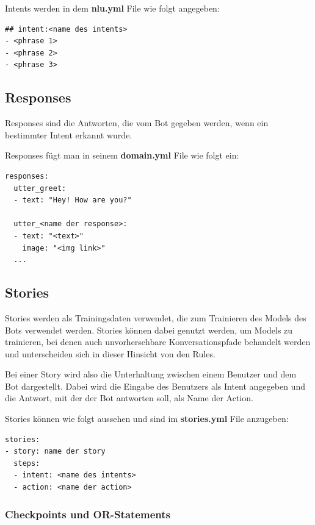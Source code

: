 Intents werden in dem \textbf{nlu.yml} File wie folgt angegeben:

\begin{lstlisting}[label={lst: Intent Example}]
## intent:<name des intents>
- <phrase 1>
- <phrase 2>
- <phrase 3>
\end{lstlisting}

\subsection{Responses}

Responses sind die Antworten, die vom Bot gegeben werden, wenn ein bestimmter Intent erkannt wurde.\cite{responses}

Responses fügt man in seinem \textbf{domain.yml} File wie folgt ein:

\begin{lstlisting}[label={lst: Responses Example}]
responses:
  utter_greet:
  - text: "Hey! How are you?"

  utter_<name der response>:
  - text: "<text>"
    image: "<img link>"
  ...
\end{lstlisting}


\subsection{Stories}

Stories werden als Trainingsdaten verwendet, die zum Trainieren des Models des Bots verwendet werden.
Stories können dabei genutzt werden, um Models zu trainieren, bei denen auch unvorhersehbare Konversationspfade behandelt werden und unterscheiden sich in dieser Hinsicht von den Rules.
\cite{stories}

Bei einer Story wird also die Unterhaltung zwischen einem Benutzer und dem Bot dargestellt.
Dabei wird die Eingabe des Benutzers als Intent angegeben und die Antwort, mit der der Bot antworten soll, als Name der Action.\cite{stories}

Stories können wie folgt aussehen und sind im \textbf{stories.yml} File anzugeben:

\begin{lstlisting}[label={lst: Stories Example}]
stories:
- story: name der story
  steps:
  - intent: <name des intents>
  - action: <name der action>
\end{lstlisting}

\subsubsection{Checkpoints und OR-Statements}


